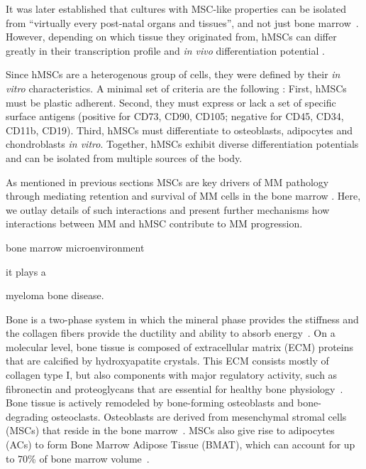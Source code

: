 It was later established that cultures with MSC-like
properties can be isolated from ``virtually every post-natal organs and
tissues'', and not just bone
marrow~\cite{dasilvameirellesMesenchymalStemCells2006}. However, depending on
which tissue they originated from, hMSCs can differ greatly in their
transcription profile and \textit{in vivo} differentiation potential
\cite{jansenFunctionalDifferencesMesenchymal2010,sacchettiNoIdenticalMesenchymal2016}.

Since hMSCs are a heterogenous group of cells, they were defined by their
\textit{in vitro} characteristics. A minimal set of criteria are the following
\cite{dominiciMinimalCriteriaDefining2006}: First, hMSCs must be plastic
adherent. Second, they must express or lack a set of specific surface antigens
(positive for CD73, CD90, CD105; negative for CD45, CD34, CD11b, CD19). Third,
hMSCs must differentiate to osteoblasts, adipocytes and chondroblasts \textit{in
    vitro}. Together, hMSCs exhibit diverse differentiation potentials and can be
isolated from multiple sources of the body. 




\label{sec:intro_myeloma_hMSC}
As mentioned in previous sections MSCs are key drivers of MM pathology through
mediating retention and survival of MM cells in the bone marrow
\cite{mangoliniBoneMarrowStromal2020}. Here, we outlay details of such
interactions and present further mechanisms how interactions between MM and hMSC
contribute to MM progression.

bone marrow microenvironment



it plays a

myeloma bone disease.

Bone is a two-phase system in which the mineral phase provides the stiffness and
the collagen fibers provide the ductility and ability to absorb
energy~\cite{viguet-carrinRoleCollagenBone2006}. On a molecular level, bone
tissue is composed of extracellular matrix (ECM) proteins that are calcified by
hydroxyapatite crystals. This ECM consists mostly of collagen type I, but also
components with major regulatory activity, such as fibronectin and proteoglycans
that are essential for healthy bone
physiology~\cite{alcorta-sevillanoDecipheringRelevanceBone2020}. Bone tissue is
actively remodeled by bone-forming osteoblasts and bone-degrading osteoclasts.
Osteoblasts are derived from mesenchymal stromal cells (MSCs) that reside in the
bone marrow~\cite{friedensteinOsteogenesisTransplantsBone1966,
    pittengerMultilineagePotentialAdult1999}. MSCs also give rise to adipocytes
(ACs) to form Bone Marrow Adipose Tissue (BMAT), which can account for up to
70\% of bone marrow volume~\cite{fazeliMarrowFatBone2013}.

